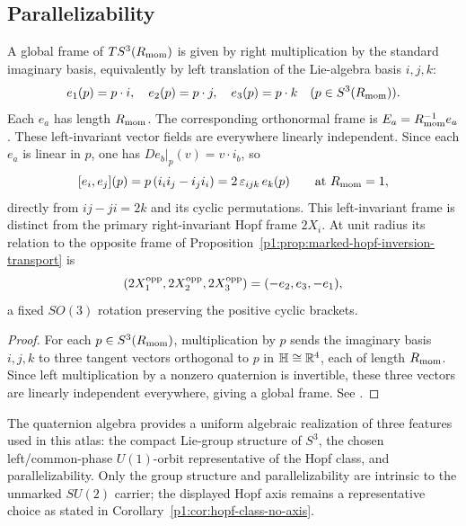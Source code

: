 \documentclass[11pt]{article}
\begin{document}
\subsection{Parallelizability}

\begin{corollary}
\label{p1:cor:left-invariant-global-frame-s3}
A global frame of $TS^3(R_{\mathrm{mom}})$ is given by right multiplication by the standard imaginary basis, equivalently by left translation of the Lie-algebra basis $i,j,k$:
\[
e_1(p) = p \cdot i, \quad e_2(p) = p \cdot j, \quad e_3(p) = p \cdot k \quad (p \in S^3(R_{\mathrm{mom}})).
\]
Each $e_a$ has length \(R_{\mathrm{mom}}\).  The corresponding orthonormal frame is \(E_a=R_{\mathrm{mom}}^{-1}e_a\). These left-invariant vector fields are everywhere linearly independent.
Since each \(e_a\) is linear in \(p\), one has
\(D e_b|_p(v)=v\cdot i_b\), so
\[
  [e_i,e_j](p)=p\,(i_ii_j-i_ji_i)=2\,\varepsilon_{ijk}\,e_k(p)
  \qquad\text{at }R_{\mathrm{mom}}=1,
\]
directly from \(ij-ji=2k\) and its cyclic permutations.  This left-invariant
frame is distinct from the primary right-invariant Hopf frame \(2X_i\).
At unit radius its relation to the opposite frame of
Proposition~\ref{p1:prop:marked-hopf-inversion-transport} is
\[
 (2X_1^{\rm opp},2X_2^{\rm opp},2X_3^{\rm opp})=(-e_2,e_3,-e_1),
\]
a fixed \(SO(3)\) rotation preserving the positive cyclic brackets.
\cite{Adams1960,hatcher2002algebraic}
\end{corollary}

\begin{proof}
For each \(p\in S^3(R_{\mathrm{mom}})\), multiplication by \(p\) sends the imaginary basis \(i,j,k\) to three tangent vectors orthogonal to \(p\) in \(\mathbb{H}\cong\mathbb{R}^4\), each of length \(R_{\mathrm{mom}}\). Since left multiplication by a nonzero quaternion is invertible, these three vectors are linearly independent everywhere, giving a global frame. See \cite{Adams1960,hatcher2002algebraic}.
\end{proof}


\begin{remark}
The quaternion algebra provides a uniform algebraic realization of three
features used in this atlas: the compact Lie-group structure of \(S^3\), the
chosen left/common-phase \(U(1)\)-orbit representative of the Hopf class, and
parallelizability.  Only the group structure and parallelizability are
intrinsic to the unmarked \(SU(2)\) carrier; the displayed Hopf axis remains a
representative choice as stated in
Corollary~\ref{p1:cor:hopf-class-no-axis}.
\end{remark}
\end{document}
